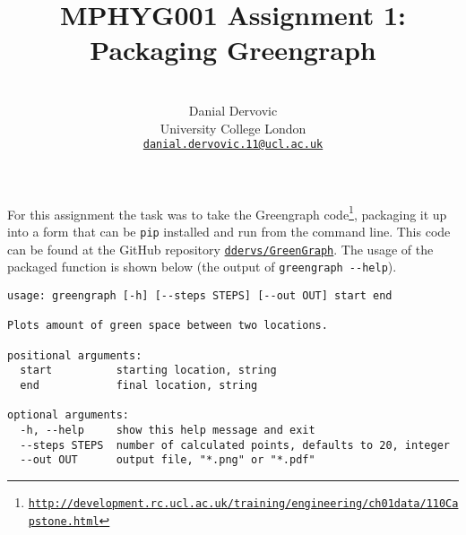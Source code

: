 \documentclass{article}
\title{\vspace{0cm}MPHYG001 Assignment 1: Packaging Greengraph}
\author{\\[0cm]
Danial Dervovic\\
\normalsize University College London\\ %
\normalsize \href{mailto:danial.dervovic.11@ucl.ac.uk}{\texttt{danial.dervovic.11@ucl.ac.uk}} %
\vspace{0mm}
}
\date{}
\begin{document}
\maketitle
For this assignment the task was to take the Greengraph code\footnote{\href{http://development.rc.ucl.ac.uk/training/engineering/ch01data/110Capstone.html}{\texttt{http://development.rc.ucl.ac.uk/training/engineering/ch01data/110Capstone.html}}}, packaging it up into a form that can be \texttt{pip} installed and run from the command line. This code can be found at the GitHub repository \href{https://github.com/ddervs/GreenGraph}{\texttt{ddervs/GreenGraph}}. The usage of the packaged function is shown below (the output of \texttt{greengraph -{}-help}).

\begin{lstlisting}
usage: greengraph [-h] [--steps STEPS] [--out OUT] start end

Plots amount of green space between two locations.

positional arguments:
  start          starting location, string
  end            final location, string

optional arguments:
  -h, --help     show this help message and exit
  --steps STEPS  number of calculated points, defaults to 20, integer
  --out OUT      output file, "*.png" or "*.pdf"
\end{lstlisting}
\end{document}
